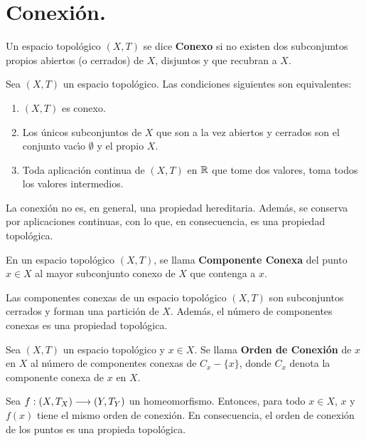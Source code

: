 \documentclass[cursovd_portada.tex]{subfiles}
\begin{document}
\newpage

\section{Conexi\'{o}n.}
\begin{defi}
Un espacio topol\'{o}gico $(X,T)$ se dice {\bf Conexo} si no existen dos subconjuntos propios abiertos (o cerrados) de
$X$, disjuntos y que recubran a $X$.
\end{defi}
\begin{teorema}
Sea $(X,T)$ un espacio topol\'{o}gico. Las condiciones siguientes son equivalentes:
\begin{enumerate}
\item $(X,T)$ es conexo.
\item Los \'{u}nicos subconjuntos de $X$ que son a la vez abiertos y cerrados son el conjunto vac\'{\i}o $\emptyset$ y el
propio $X$.
\item Toda aplicaci\'{o}n continua de $(X,T)$ en $\mathbb{R}$ que tome dos valores, toma todos los valores intermedios.
\end{enumerate}
\end{teorema}
\begin{prop}
La conexi\'{o}n no es, en general, una propiedad hereditaria. Adem\'{a}s, se conserva por aplicaciones continuas, con lo
que, en consecuencia, es una propiedad topol\'{o}gica.
\end{prop}
\begin{defi}
En un espacio topol\'{o}gico $(X,T)$, se llama {\bf Componente Conexa} del punto $x\in X$ al mayor subconjunto conexo
de $X$ que contenga a $x$.
\end{defi}
\begin{prop}
Las componentes conexas de un espacio topol\'{o}gico $(X,T)$ son subconjuntos cerrados y forman una partici\'{o}n de $X$.
Adem\'{a}s, el n\'{u}mero de componentes conexas es una propiedad topol\'{o}gica.
\end{prop}
\begin{defi}
Sea $(X,T)$ un espacio topol\'{o}gico y $x\in X$. Se llama {\bf Orden de Conexi\'{o}n} de $x$ en $X$ al n\'{u}mero de
componentes conexas de $C_x-\{x\}$, donde $C_x$ denota la componente conexa de $x$ en $X$.
\end{defi}
\begin{prop}
Sea $f:(X,T_X)\longrightarrow (Y,T_Y)$ un homeomorfismo. Entonces, para todo $x\in X$, $x$ y $f(x)$ tiene  el mismo orden de
conexi\'{o}n. En consecuencia, el orden de conexi\'{o}n de los puntos es una propieda topol\'{o}gica.
\end{prop}
\end{document}
